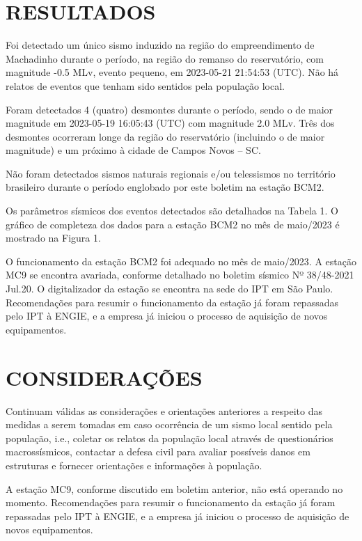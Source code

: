 \documentclass[12pt]{iptex}
\begin{document}
\section{RESULTADOS}
\label{sec:resultados}
Foi detectado um único sismo induzido na região do empreendimento de Machadinho durante o período, na região do remanso do reservatório, com magnitude -0.5 MLv, evento pequeno, em 2023-05-21 21:54:53 (UTC). Não há relatos de eventos que tenham sido sentidos pela população local.

Foram detectados 4 (quatro) desmontes durante o período, sendo o de maior magnitude em 2023-05-19 16:05:43 (UTC) com magnitude 2.0 MLv. Três dos desmontes ocorreram longe da região do reservatório (incluindo o de maior magnitude) e um próximo à cidade de Campos Novos – SC.

Não foram detectados sismos naturais regionais e/ou telessismos no território brasileiro durante o período englobado por este boletim na estação BCM2.

Os parâmetros sísmicos dos eventos detectados são detalhados na Tabela 1. O gráfico de completeza dos dados para a estação BCM2 no mês de maio/2023 é mostrado na Figura 1.

O funcionamento da estação BCM2 foi adequado no mês de maio/2023. A estação MC9 se encontra avariada, conforme detalhado no boletim sísmico Nº 38/48-2021 Jul.20. O digitalizador da estação se encontra na sede do IPT em São Paulo. Recomendações para resumir o funcionamento da estação já foram repassadas pelo IPT à ENGIE, e a empresa já iniciou o processo de aquisição de novos equipamentos.

\section{CONSIDERAÇÕES}
\label{sec:consideracoes}
Continuam válidas as considerações e orientações anteriores a respeito das medidas a serem tomadas em caso ocorrência de um sismo local sentido pela população, i.e., coletar os relatos da população local através de questionários macrossísmicos, contactar a defesa civil para avaliar possíveis danos em estruturas e fornecer orientações e informações à população.

A estação MC9, conforme discutido em boletim anterior, não está operando no momento. Recomendações para resumir o funcionamento da estação já foram repassadas pelo IPT à ENGIE, e a empresa já iniciou o processo de aquisição de novos equipamentos.

\newpage
\end{document}
